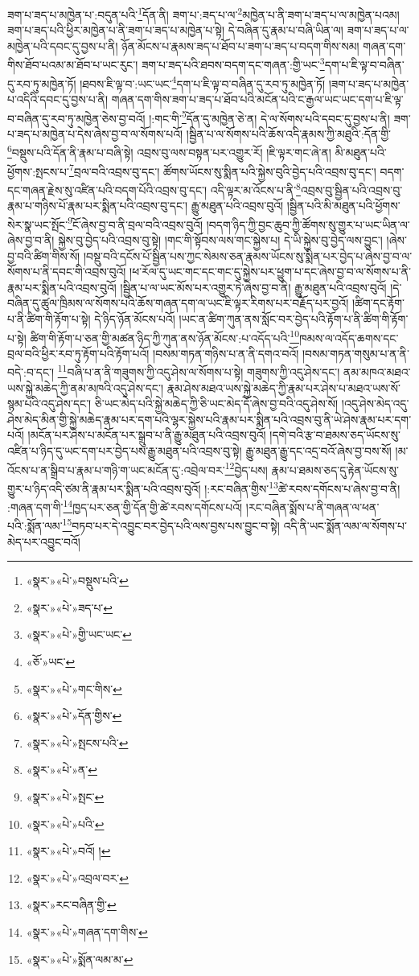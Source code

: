 ཟག་པ་ཟད་པ་མཁྱེན་པ་:བདུན་པའི་\footnote{«སྣར་»«པེ་»བསྡུས་པའི་}དོན་ནི། ཟག་པ་:ཟད་པ་ལ་\footnote{«སྣར་»«པེ་»ཟད་པ་}མཁྱེན་པ་ནི་ཟག་པ་ཟད་པ་ལ་མཁྱེན་པའམ། ཟག་པ་ཟད་པའི་ཕྱིར་མཁྱེན་པ་ནི་ཟག་པ་ཟད་པ་མཁྱེན་པ་སྟེ། དེ་བཞིན་དུ་རྣམ་པ་བཞི་ཡིན་ལ། ཟག་པ་ཟད་པ་ལ་མཁྱེན་པའི་དབང་དུ་བྱས་པ་ནི། ཉོན་མོངས་པ་རྣམས་ཟད་པ་ཐོབ་པ་ཟག་པ་ཟད་པ་བདག་གིས་སམ། གཞན་དག་གིས་ཐོབ་པའམ་མ་ཐོབ་པ་ཡང་རུང་། ཟག་པ་ཟད་པའི་ཐབས་བདག་དང་གཞན་:གྱི་ཡང་\footnote{«སྣར་»«པེ་»གྱི་ཡང་ཡང་}དག་པ་ཇི་ལྟ་བ་བཞིན་དུ་རབ་ཏུ་མཁྱེན་ཏོ། །ཐབས་ཇི་ལྟ་བ་:ཡང་ཡང་\footnote{«ཅོ་»ཡང་}དག་པ་ཇི་ལྟ་བ་བཞིན་དུ་རབ་ཏུ་མཁྱེན་ཏོ། །ཟག་པ་ཟད་པ་མཁྱེན་པ་འདིའི་དབང་དུ་བྱས་པ་ནི། གཞན་དག་གིས་ཟག་པ་ཟད་པ་ཐོབ་པའི་མངོན་པའི་ང་རྒྱལ་ཡང་ཡང་དག་པ་ཇི་ལྟ་བ་བཞིན་དུ་རབ་ཏུ་མཁྱེན་ཅེས་བྱ་བའོ། །:གང་གི་\footnote{«སྣར་»«པེ་»གང་གིས་}དོན་དུ་མཁྱེན་ཅེ་ན། དེ་ལ་སོགས་པའི་དབང་དུ་བྱས་པ་ནི། ཟག་པ་ཟད་པ་མཁྱེན་པ་དེས་ཞེས་བྱ་བ་ལ་སོགས་པའོ། །སྦྱིན་པ་ལ་སོགས་པའི་ཆོས་འདི་རྣམས་ཀྱི་མཐུའི་:དོན་གྱི་\footnote{«སྣར་»«པེ་»དོན་གྱིས་}བསྡུས་པའི་དོན་ནི་རྣམ་པ་བཞི་སྟེ། འབྲས་བུ་ལས་བསྟན་པར་འགྱུར་རོ། །ཇི་ལྟར་གང་ཞེ་ན། མི་མཐུན་པའི་ཕྱོགས་:སྤངས་པ་\footnote{«སྣར་»«པེ་»སྤངས་པའི་}བྲལ་བའི་འབྲས་བུ་དང་། ཚོགས་ཡོངས་སུ་སྨིན་པའི་སྐྱེས་བུའི་བྱེད་པའི་འབྲས་བུ་དང་། བདག་དང་གཞན་རྗེས་སུ་འཛིན་པའི་བདག་པོའི་འབྲས་བུ་དང་། འདི་ལྟར་མ་འོངས་པ་ནི་\footnote{«སྣར་»«པེ་»ན་}འབྲས་བུ་སྦྱིན་པའི་འབྲས་བུ་རྣམ་པ་གཉིས་པོ་རྣམ་པར་སྨིན་པའི་འབྲས་བུ་དང་། རྒྱུ་མཐུན་པའི་འབྲས་བུའོ། །སྦྱིན་པའི་མི་མཐུན་པའི་ཕྱོགས་སེར་སྣ་ཡང་སྤོང་\footnote{«སྣར་»«པེ་»སྤང་}ངོ་ཞེས་བྱ་བ་ནི་བྲལ་བའི་འབྲས་བུའོ། །བདག་ཉིད་ཀྱི་བྱང་ཆུབ་ཀྱི་ཚོགས་སུ་གྱུར་པ་ཡང་ཡིན་ལ་ཞེས་བྱ་བ་ནི། སྐྱེས་བུ་བྱེད་པའི་འབྲས་བུ་སྟེ། །གང་གི་སྟོབས་ལས་གང་སྐྱེས་པ། དེ་ཡི་སྐྱེས་བུ་བྱེད་ལས་བྱུང་། །ཞེས་བྱ་བའི་ཚིག་གིས་སོ། །བསྡུ་བའི་དངོས་པོ་སྦྱིན་པས་ཀྱང་སེམས་ཅན་རྣམས་ཡོངས་སུ་སྨིན་པར་བྱེད་པ་ཞེས་བྱ་བ་ལ་སོགས་པ་ནི་དབང་གི་འབྲས་བུའོ། །ཕ་རོལ་དུ་ཡང་གང་དང་གང་དུ་སྐྱེས་པར་ཕྱུག་པ་དང་ཞེས་བྱ་བ་ལ་སོགས་པ་ནི་རྣམ་པར་སྨིན་པའི་འབྲས་བུའོ། །སྦྱིན་པ་ལ་ཡང་མོས་པར་འགྱུར་ཏེ་ཞེས་བྱ་བ་ནི། རྒྱུ་མཐུན་པའི་འབྲས་བུའོ། །དེ་བཞིན་དུ་ཚུལ་ཁྲིམས་ལ་སོགས་པའི་ཆོས་གཞན་དག་ལ་ཡང་ཇི་ལྟར་རིགས་པར་བརྗོད་པར་བྱའོ། །ཚིག་དང་རྟོག་པ་ནི་ཚིག་གི་རྟོག་པ་སྟེ། དེ་ཉིད་ཉོན་མོངས་པའོ། །ཡང་ན་ཚིག་ཀུན་ནས་སློང་བར་བྱེད་པའི་རྟོག་པ་ནི་ཚིག་གི་རྟོག་པ་སྟེ། ཚིག་གི་རྟོག་པ་ཅན་གྱི་མཚན་ཉིད་ཀྱི་ཀུན་ནས་ཉོན་མོངས་:པ་འདོད་པའི་\footnote{«སྣར་»«པེ་»པའི་}ཁམས་ལ་འདོད་ཆགས་དང་བྲལ་བའི་ཕྱིར་རབ་ཏུ་རྟོག་པའི་རྟོག་པའོ། །བསམ་གཏན་གཉིས་པ་ན་ནི་དགའ་བའོ། །བསམ་གཏན་གསུམ་པ་ན་ནི་བདེ་:བ་དང་། \footnote{«སྣར་»«པེ་»བའོ། ། }བཞི་པ་ན་ནི་གཟུགས་ཀྱི་འདུ་ཤེས་ལ་སོགས་པ་སྟེ། གཟུགས་ཀྱི་འདུ་ཤེས་དང་། ནམ་མཁའ་མཐའ་ཡས་སྐྱེ་མཆེད་ཀྱི་ནམ་མཁའི་འདུ་ཤེས་དང་། རྣམ་ཤེས་མཐའ་ཡས་སྐྱེ་མཆེད་ཀྱི་རྣམ་པར་ཤེས་པ་མཐའ་ཡས་སོ་སྙམ་པའི་འདུ་ཤེས་དང་། ཅི་ཡང་མེད་པའི་སྐྱེ་མཆེད་ཀྱི་ཅི་ཡང་མེད་དོ་ཞེས་བྱ་བའི་འདུ་ཤེས་སོ། །འདུ་ཤེས་མེད་འདུ་ཤེས་མེད་མིན་གྱི་སྐྱེ་མཆེད་རྣམ་པར་དག་པའི་ལྷར་སྐྱེས་པའི་རྣམ་པར་སྨིན་པའི་འབྲས་བུ་ནི་ཡེ་ཤེས་རྣམ་པར་དག་པའོ། །མངོན་པར་ཤེས་པ་མངོན་པར་སྒྲུབ་པ་ནི་རྒྱུ་མཐུན་པའི་འབྲས་བུའོ། །དགེ་བའི་རྩ་བ་ཐམས་ཅད་ཡོངས་སུ་འཛིན་པ་ཉིད་དུ་ཡང་དག་པར་བྱེད་པས་རྒྱུ་མཐུན་པའི་འབྲས་བུ་སྟེ། རྒྱུ་མཐུན་རྒྱུ་དང་འདྲ་བའོ་ཞེས་བྱ་བས་སོ། །མ་འོངས་པ་ན་སྒྲིབ་པ་རྣམ་པ་གཉི་ག་ཡང་མངོན་དུ་:འབྲེལ་བར་\footnote{«སྣར་»«པེ་»འབྲལ་བར་}བྱེད་པས། རྣམ་པ་ཐམས་ཅད་དུ་རྟེན་ཡོངས་སུ་གྱུར་པ་ཉིད་འདི་ཙམ་ནི་རྣམ་པར་སྨིན་པའི་འབྲས་བུའོ། །:རང་བཞིན་གྱིས་\footnote{«སྣར་»རང་བཞིན་གྱི་}ཚེ་རབས་དགོངས་པ་ཞེས་བྱ་བ་ནི། :གཞན་དག་གི་\footnote{«སྣར་»«པེ་»གཞན་དག་གིས་}ཁྱད་པར་ཅན་གྱི་དོན་གྱི་ཚེ་རབས་དགོངས་པའོ། །རང་བཞིན་སྨོས་པ་ནི་གཞན་ལ་ཕན་པའི་:སྨོན་ལམ་\footnote{«སྣར་»«པེ་»སྨོན་ལམ་མ་}བཏབ་པར་དེ་འབྱུང་བར་བྱེད་པའི་ལས་བྱས་པས་བྱུང་བ་སྟེ། འདི་ནི་ཡང་སྨོན་ལམ་ལ་སོགས་པ་མེད་པར་འབྱུང་བའོ། 